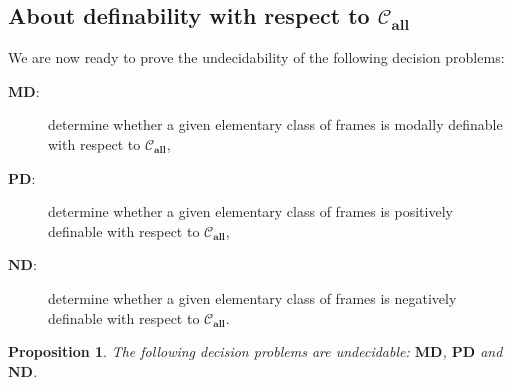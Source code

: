 \documentclass[draft]{article}
\newtheorem{proposition}{Proposition}
\def\allfra{\mathbf{all}}
\begin{document}
\subsection{About definability with respect to ${\mathcal C}_{\allfra}$}
%
%
We are now ready to prove the undecidability of the following decision problems:
%
%
\begin{description}
%
%
\item[$\mathbf{MD}$:] determine whether a given elementary class of frames is modally definable with respect to ${\mathcal C}_{\allfra}$,
%
%
\item[$\mathbf{PD}$:] determine whether a given elementary class of frames is positively definable with respect to ${\mathcal C}_{\allfra}$,
%
%
\item[$\mathbf{ND}$:] determine whether a given elementary class of frames is negatively definable with respect to ${\mathcal C}_{\allfra}$.
%
%
\end{description}
%
%
\begin{proposition}\label{proposition:modal:definability:is:undecidable}
%
%
The following decision problems are undecidable: $\mathbf{MD}$, $\mathbf{PD}$ and $\mathbf{ND}$.
%
%
\end{proposition}
%
%
\end{document}
